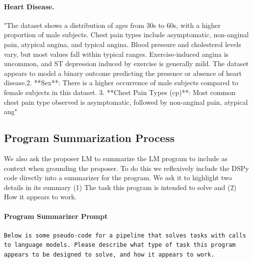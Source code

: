 \paragraph{Heart Disease.} "The dataset shows a distribution of ages from 30s to 60s, with a higher proportion of male subjects. Chest pain types include asymptomatic, non-anginal pain, atypical angina, and typical angina. Blood pressure and cholesterol levels vary, but most values fall within typical ranges. Exercise-induced angina is uncommon, and ST depression induced by exercise is generally mild. The dataset appears to model a binary outcome predicting the presence or absence of heart disease.2. **Sex**: There is a higher occurrence of male subjects compared to female subjects in this dataset. 3. **Chest Pain Types (cp)**: Most common chest pain type observed is asymptomatic, followed by non-anginal pain, atypical ang"



\subsection{Program Summarization Process}
We also ask the proposer LM to summarize the LM program to include as context when grounding the proposer.  To do this we reflexively include the DSPy code directly into a summarizer for the program.  We ask it to highlight two details in its summary (1) The task this program is intended to solve and (2) How it appears to work.

\paragraph{Program Summarizer Prompt}
\texttt{Below is some pseudo-code for a pipeline that solves tasks with calls to language models. Please describe what type of task this program appears to be designed to solve, and how it appears to work.}
